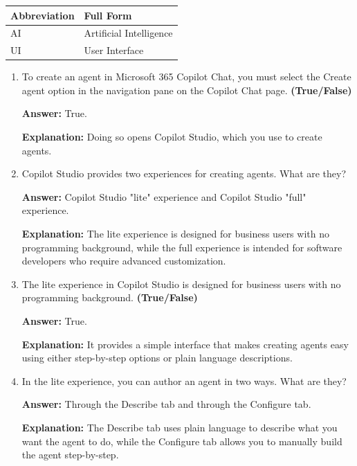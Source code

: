 \documentclass[10pt]{article}
\begin{document}
\begin{center}
\begin{tabular}{>{\raggedright\arraybackslash}p{} >{\raggedright\arraybackslash}p{}}
\toprule
\textbf{Abbreviation} & \textbf{Full Form} \\
\midrule
AI & Artificial Intelligence \\
UI & User Interface \\
\end{tabular}
\end{center}

\begin{enumerate}[leftmargin=*]

\item To create an agent in Microsoft 365 Copilot Chat, you must select the Create agent option in the navigation pane on the Copilot Chat page. \textbf{(True/False)}

\textbf{Answer:} True.

\textbf{Explanation:} Doing so opens Copilot Studio, which you use to create agents.

\item Copilot Studio provides two experiences for creating agents. What are they?

\textbf{Answer:} Copilot Studio "lite" experience and Copilot Studio "full" experience.

\textbf{Explanation:} The lite experience is designed for business users with no programming background, while the full experience is intended for software developers who require advanced customization.

\item The lite experience in Copilot Studio is designed for business users with no programming background. \textbf{(True/False)}

\textbf{Answer:} True.

\textbf{Explanation:} It provides a simple interface that makes creating agents easy using either step-by-step options or plain language descriptions.

\item In the lite experience, you can author an agent in two ways. What are they?

\textbf{Answer:} Through the Describe tab and through the Configure tab.

\textbf{Explanation:} The Describe tab uses plain language to describe what you want the agent to do, while the Configure tab allows you to manually build the agent step-by-step.


\end{enumerate}
\end{document}

